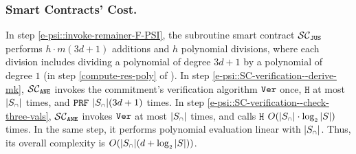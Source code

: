 \vspace{-3,3mm}
 \subsubsection{Smart Contracts' Cost.}

In step \ref{e-psi::invoke-remainer-F-PSI}, the subroutine smart contract $\mathcal{SC}_{\mathtt{JUS}}$ performs $h\cdot m(3d+1)$ additions and $h$ polynomial divisions,  where each division includes dividing a polynomial of degree $3d+1$ by a polynomial of degree $1$ (in step \ref{compute-res-poly} of \fpsi). In step \ref{e-psi::SC-verification--derive-mk}, $\mathcal{SC}_{\mathtt{ANE}}$ invokes the commitment's verification algorithm $\mathtt{Ver}$ once,  $\mathtt{H}$ at most $|S_{\scriptscriptstyle \cap}|$ times, and $\mathtt{PRF}$ $|S_{\scriptscriptstyle \cap}| (3d+1)$ times. In step \ref{e-psi::SC-verification--check-three-vals}, $\mathcal{SC}_{\mathtt{ANE}}$ invokes  $\mathtt{Ver}$ at most $|S_{\scriptscriptstyle \cap}|$ times, and calls $\mathtt{H}$ $O(|S_{\scriptscriptstyle \cap}|\cdot \log_{\scriptscriptstyle 2} |S|)$ times. In the same step, it  performs polynomial evaluation linear with  $|S_{\scriptscriptstyle \cap}|$. Thus, its overall complexity is $O( |S_{\scriptscriptstyle \cap}|(d+ \log_{\scriptscriptstyle 2} |S|))$.
%












%

  




